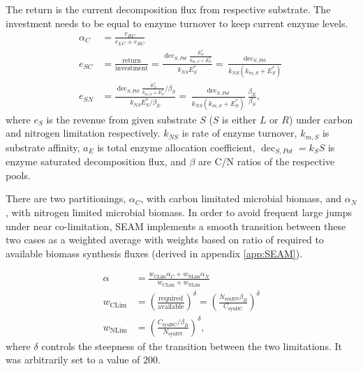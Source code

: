 The return is the current decomposition flux from respective substrate. The
investment needs to be equal to enzyme turnover to keep current enzyme levels.
% 
\begin{subequations}
\label{eq:allocRev}
\begin{align}
\alpha_C &= \frac{e_{RC}}{e_{LC} + e_{RC}} \\
e_{SC} &= \frac{\text{return}}{\text{investment}} 
= \frac{\operatorname{dec}_{S,Pot} \frac{E_S^*}{k_{m,S} + E_S^*}} {k_{NS}E_S^*} 
= \frac{\operatorname{dec}_{S,Pot}} {k_{NS}(k_{m,S} + E_S^*)} \\ 
e_{SN} &= \frac{\operatorname{dec}_{S,Pot}
\frac{E_S^*}{k_{m,S} + E_S^*} / \beta_S} {k_{NS} E_S^* / \beta_E} 
= \frac{\operatorname{dec}_{S,Pot}}{k_{NS} (k_{m,S} + E_S^*)}
\frac{\beta_E}{\beta_S}
\text{,} 
\end{align}
\end{subequations}
where $e_S$ is the revenue from given substrate $S$ ($S$ is either $L$ or $R$)
under carbon and nitrogen limitation respectively.
$k_{NS}$ is rate of enzyme turnover, $k_{m,S}$ is substrate affinity, $a_E$ is
total enzyme allocation coefficient, $\operatorname{dec}_{S,Pot} = k_S S$ is
enzyme saturated decomposition flux, and $\beta$ are C/N ratios of the
respective pools.

There are two partitionings, $\alpha_C$, with carbon limitated microbial
biomass, and $\alpha_N$, with nitrogen limited microbial biomass. In order to
avoid frequent large jumps under near co-limitation, SEAM implements a smooth
transition between these two cases as a weighted average with weights based
on ratio of required to available biomass synthesis fluxes (derived in
appendix \ref{app:SEAM}).

\begin{subequations}
\label{eq:allocRev}
\begin{align}
\alpha &= \frac{w_{\operatorname{CLim}} \alpha_C + w_{\operatorname{NLim}}
\alpha_N}{w_{\operatorname{CLim}}  + w_{\operatorname{NLim}} } \\
w_\operatorname{CLim} &= \left( \frac{\text{required}}{\text{available}}
\right)^\delta 
= \left( \frac{ N_{\operatorname{synBN}} \beta_B }{ C_{\operatorname{synBC}} }
\right)^\delta
\\
w_\operatorname{NLim} &= \left( \frac{ C_{\operatorname{synBC}} / \beta_B }{
N_{\operatorname{synBN}} } \right)^\delta
\text{,} 
\end{align}
\end{subequations}
where $\delta$ controls the steepness of the transition between the two
limitations. It was arbitrarily set to a value of 200.


